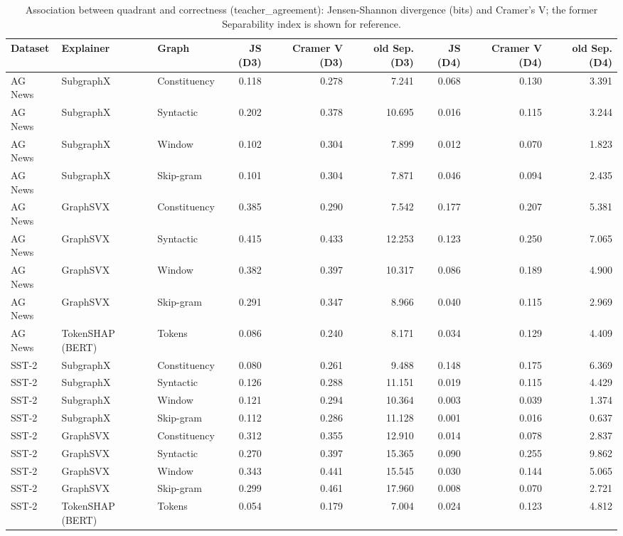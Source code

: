 \begin{table}[H]
\centering
\small
\caption{Association between quadrant and correctness (teacher_agreement): Jensen-Shannon divergence (bits) and Cramer's V; the former Separability index is shown for reference.}
\label{tab:quadrants_teacher_agreement}
\begin{tabular}{lllrrrrrr}
\toprule
Dataset & Explainer & Graph & JS (D3) & Cramer V (D3) & old Sep. (D3) & JS (D4) & Cramer V (D4) & old Sep. (D4) \\
\midrule
AG News & SubgraphX & Constituency & 0.118 & 0.278 & 7.241 & 0.068 & 0.130 & 3.391 \\
AG News & SubgraphX & Syntactic & 0.202 & 0.378 & 10.695 & 0.016 & 0.115 & 3.244 \\
AG News & SubgraphX & Window & 0.102 & 0.304 & 7.899 & 0.012 & 0.070 & 1.823 \\
AG News & SubgraphX & Skip-gram & 0.101 & 0.304 & 7.871 & 0.046 & 0.094 & 2.435 \\
AG News & GraphSVX & Constituency & 0.385 & 0.290 & 7.542 & 0.177 & 0.207 & 5.381 \\
AG News & GraphSVX & Syntactic & 0.415 & 0.433 & 12.253 & 0.123 & 0.250 & 7.065 \\
AG News & GraphSVX & Window & 0.382 & 0.397 & 10.317 & 0.086 & 0.189 & 4.900 \\
AG News & GraphSVX & Skip-gram & 0.291 & 0.347 & 8.966 & 0.040 & 0.115 & 2.969 \\
AG News & TokenSHAP (BERT) & Tokens & 0.086 & 0.240 & 8.171 & 0.034 & 0.129 & 4.409 \\
SST-2 & SubgraphX & Constituency & 0.080 & 0.261 & 9.488 & 0.148 & 0.175 & 6.369 \\
SST-2 & SubgraphX & Syntactic & 0.126 & 0.288 & 11.151 & 0.019 & 0.115 & 4.429 \\
SST-2 & SubgraphX & Window & 0.121 & 0.294 & 10.364 & 0.003 & 0.039 & 1.374 \\
SST-2 & SubgraphX & Skip-gram & 0.112 & 0.286 & 11.128 & 0.001 & 0.016 & 0.637 \\
SST-2 & GraphSVX & Constituency & 0.312 & 0.355 & 12.910 & 0.014 & 0.078 & 2.837 \\
SST-2 & GraphSVX & Syntactic & 0.270 & 0.397 & 15.365 & 0.090 & 0.255 & 9.862 \\
SST-2 & GraphSVX & Window & 0.343 & 0.441 & 15.545 & 0.030 & 0.144 & 5.065 \\
SST-2 & GraphSVX & Skip-gram & 0.299 & 0.461 & 17.960 & 0.008 & 0.070 & 2.721 \\
SST-2 & TokenSHAP (BERT) & Tokens & 0.054 & 0.179 & 7.004 & 0.024 & 0.123 & 4.812 \\
\bottomrule
\end{tabular}
\end{table}

